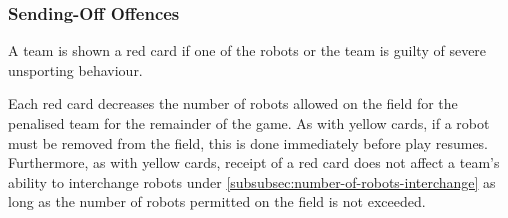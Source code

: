 \subsubsection{Sending-Off Offences}
A team is  shown a red card if one of the robots or the team is guilty of severe unsporting behaviour.

Each red card decreases the number of robots allowed on the field for the penalised team for the remainder of the game.
As with yellow cards, if a robot must be removed from the field, this is done immediately before play resumes.
Furthermore, as with yellow cards, receipt of a red card does not affect a team's ability to interchange robots under \autoref{subsubsec:number-of-robots-interchange} as long as the number of robots permitted on the field is not exceeded.

